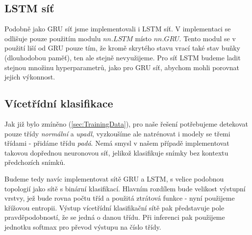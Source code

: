 \subsection{LSTM síť}

Podobně jako GRU síť jsme implementovali i LSTM síť. V implementaci se odlišuje
pouze použitím modulu $nn.LSTM$ místo $nn.GRU$. Tento modul se v použití liší
od GRU pouze tím, že kromě skrytého stavu vrací také stav buňky (dlouhodobou
paměť), ten ale stejně nevyužijeme. Pro síť LSTM budeme ladit stejnou množinu
hyperparametrů, jako pro GRU síť, abychom mohli porovnat jejich výkonnost.

\subsection{Vícetřídní klasifikace}

Jak již bylo zmíněno (\ref{sec:TrainingData}), pro naše řešení potřebujeme
detekovat pouze třídy \textit{normální} a \textit{upadl}, vyzkoušíme ale
natrénovat i modely se třemi třídami - přidáme třídu \textit{padá}. Nemá smysl
v našem případě implementovat takovou dopřednou neuronovou síť, jelikož
klasifikuje snímky bez kontextu předchozích snímků.

Budeme tedy navíc implementovat sítě GRU a LSTM, s velice podobnou topologií
jako sítě s binární klasifikací. Hlavním rozdílem bude velikost výstupní
vrstvy, jež bude rovna počtu tříd a použitá ztrátová funkce - nyní použijeme
křížovou entropii. Výstup vícetřídní klasifikační sítě pak představuje pole
pravděpodobností, že se jedná o danou třídu. Při inferenci pak použijeme jednotku 
softmax pro převod výstupu na číslo třídy.

\endinput
